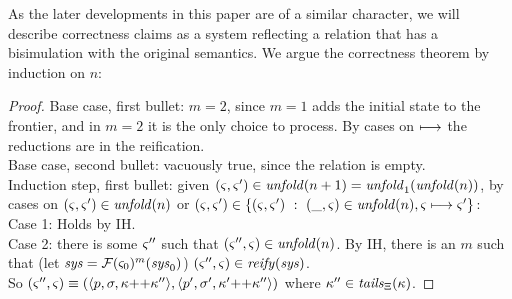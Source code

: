 As the later developments in this paper are of a similar character, we will describe correctness claims as a system reflecting a relation that has a bisimulation with the original semantics.
%
We argue the correctness theorem by induction on $n$:
\begin{proof}
  Base case, first bullet: $m = 2$, since $m = 1$ adds the initial state to the frontier, and in $m = 2$ it is the only choice to process. By cases on $\longmapsto$ the reductions are in the reification. \\
  Base case, second bullet: vacuously true, since the relation is empty. \\
  Induction step, first bullet: 
given $(\varsigma,\varsigma') \in \mathit{unfold}(n+1) = \mathit{unfold}_1(\mathit{unfold}(n))$,
by cases on $(\varsigma,\varsigma') \in \mathit{unfold}(n)$ or $(\varsigma,\varsigma') \in \{ (\varsigma,\varsigma')\ :\ (\_,\varsigma) \in \mathit{unfold}(n), \varsigma \longmapsto \varsigma'\}$:
\\
Case 1: Holds by IH.
\\
Case 2: there is some $\varsigma''$ such that $(\varsigma'',\varsigma) \in \mathit{unfold}(n)$.
        By IH, there is an $m$ such that (let $\mathit{sys} = {\mathcal F}(\varsigma_0)^m(\mathit{sys}_0)$) $(\varsigma'',\varsigma) \in \mathit{reify}(\mathit{sys})$.
\\
        So $(\varsigma'',\varsigma) \equiv (\langle p, \sigma, \kappa {\tt ++} \kappa'' \rangle,\langle p',\sigma',\kappa' {\tt ++} \kappa'' \rangle)$ where $\kappa'' \in \mathit{tails}_{\Xi}(\kappa)$.


\end{proof}
